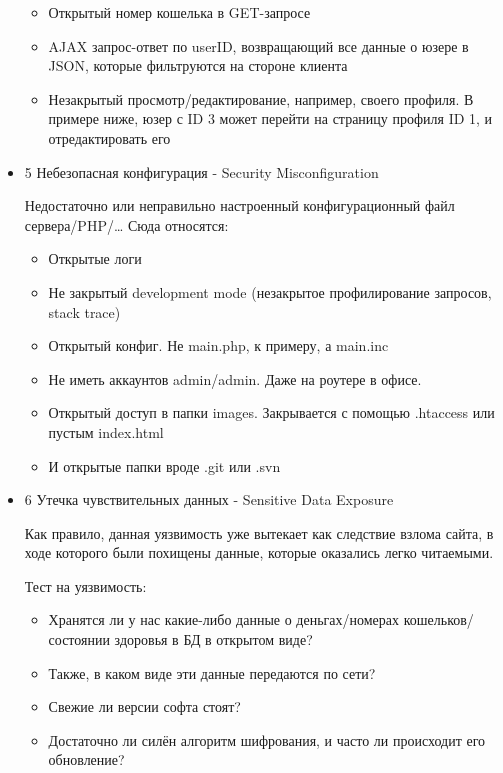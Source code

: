\documentclass{article}
\begin{document}
\begin{itemize}
\begin{itemize}
		\item Открытый номер кошелька в GET-запросе
		
		\item AJAX запрос-ответ по userID, возвращающий все данные о юзере в JSON, которые фильтруются на стороне клиента
		
		\item Незакрытый просмотр/редактирование, например, своего профиля. В примере ниже, юзер с ID 3 может перейти на страницу профиля ID 1, и отредактировать его
		
	\end{itemize}
	
	\item 5 Небезопасная конфигурация - Security Misconfiguration
	
	Недостаточно или неправильно настроенный конфигурационный файл сервера/PHP/…
	Сюда относятся:
	
	\begin{itemize}
		\item Открытые логи
		\item Не закрытый development mode (незакрытое профилирование запросов, stack trace)
		\item Открытый конфиг. Не main.php, к примеру, а main.inc
		\item Не иметь аккаунтов admin/admin. Даже на роутере в офисе.
		\item Открытый доступ в папки images. Закрывается с помощью .htaccess или пустым index.html
		\item И открытые папки вроде .git или .svn
	\end{itemize}
	
	\item 6 Утечка чувствительных данных - Sensitive Data Exposure
	
	Как правило, данная уязвимость уже вытекает как следствие взлома сайта, в ходе которого были похищены данные, которые оказались легко читаемыми.
	
	Тест на уязвимость:
	\begin{itemize}
		\item Хранятся ли у нас какие-либо данные о деньгах/номерах кошельков/состоянии здоровья в БД в открытом виде?
		\item Также, в каком виде эти данные передаются по сети?
		\item Свежие ли версии софта стоят?
		\item Достаточно ли силён алгоритм шифрования, и часто ли происходит его обновление?
	\end{itemize}
	

\end{itemize}
\end{document}
